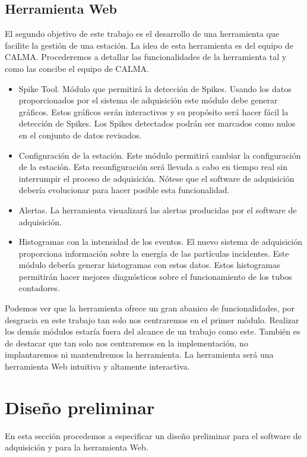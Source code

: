 	\subsection{Herramienta Web}
		El segundo objetivo de este trabajo es el desarrollo de una herramienta que facilite la gestión de una estación. La idea de esta
		herramienta es del equipo de CALMA. Procederemos a detallar las funcionalidades de la herramienta tal y como las concibe el equipo de
		CALMA.
		\begin{itemize}
	         	\item	Spike Tool. Módulo que permitirá la detección de Spikes. Usando los datos proporcionados por el sistema de
			  	adquisición este módulo debe generar gráficos. Estos gráficos serán interactivos y su propósito será hacer fácil la
				detección de Spikes. Los Spikes detectados podrán ser marcados como nulos en el conjunto de datos revisados. 
			\item 	Configuración de la estación. Este módulo permitirá cambiar la configuración de la estación. Esta reconfiguración será
				llevada a cabo en tiempo real sin interrumpir el proceso de adquisición. Nótese que el software de adquisición debería
				evolucionar para hacer posible esta funcionalidad.
			\item	Alertas. La herramienta visualizará las alertas producidas por el software de adquisición.
			\item 	Histogramas con la intensidad de los eventos. El nuevo sistema de adquisición proporciona información sobre la energía
				de las partículas incidentes. Este módulo debería generar histogramas con estos datos. Estos histogramas permitirán
				hacer mejores diagnósticos sobre el funcionamiento de los tubos contadores. 
		\end{itemize}
		Podemos ver que la herramienta ofrece un gran abanico de funcionalidades, por desgracia en este trabajo tan solo nos centraremos en el
		primer módulo. Realizar los demás módulos estaría fuera del alcance de un trabajo como este. También es de destacar que tan solo nos
		centraremos en la implementación, no implantaremos ni mantendremos la herramienta. La herramienta será una herramienta Web intuitiva y
		altamente interactiva. 

\section{Diseño preliminar}
	En esta sección procedemos a especificar un diseño preliminar para el software de adquisición y para la herramienta Web.
